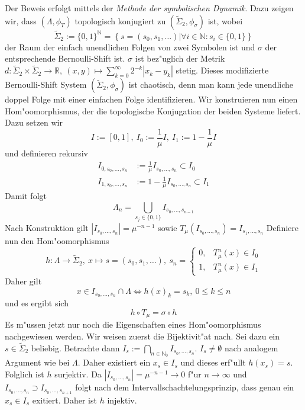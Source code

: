 \documentclass[a4paper, 13pt]{scrreprt}
\theoremstyle{definition} \newtheorem{definition}{Definition}[section]
\newenvironment{beweis}[1][Beweis]{\begin{trivlist}
\item[\hskip \labelsep {\bfseries #1}]}{\end{trivlist}}
\newcommand{\RR}{\mathbb{R}}
\begin{document}
\begin{beweis}
Der Beweis erfolgt mittels der \emph{Methode der symbolischen Dynamik}. Dazu zeigen wir, dass $(\Lambda, \phi_T)$ topologisch konjugiert zu $(\tilde\Sigma_2, \phi_\sigma)$ ist, wobei 
$$\tilde\Sigma_2 := \{0,1\}^\mathbb{N} = \left\{\left .s=(s_0, s_1, \ldots)\right| \forall i \in \mathbb{N}: s_i\in\{0,1\} \right \}$$
der Raum der einfach unendlichen Folgen von zwei Symbolen ist und $\sigma$ der entsprechende Bernoulli-Shift ist. $\sigma$ ist bez"uglich der Metrik $d\colon\tilde\Sigma_2 \times \tilde\Sigma_2 \to \RR, \ (x,y) \mapsto \sum_{k=0}^{\infty}{2^{-k}|x_k-y_k|}$ stetig. Dieses modifizierte Bernoulli-Shift System $(\tilde\Sigma_2, \phi_\sigma)$ ist chaotisch, denn man kann jede unendliche doppel Folge mit einer einfachen Folge identifizieren.
Wir konstruieren nun einen Hom"oomorphismus, der die topologische Konjugation der beiden Systeme liefert. Dazu setzen wir
$$ I := [0,1], \ I_0 := \frac 1\mu I, \ I_1 := 1-\frac 1\mu I$$
und definieren rekursiv
\begin{align*}
I_{0,s_0,\ldots,s_n} &:= \frac 1\mu I_{s_0,\ldots, s_n}\subset I_0\\
I_{1,s_0,\ldots,s_n} &:= 1-\frac 1\mu I_{s_0,\ldots, s_n}\subset I_1
\end{align*}
Damit folgt
$$ \Lambda_n = \bigcup_{s_j\in\{0,1\}}{I_{s_0,\ldots,s_{n-1}}}$$
Nach Konstruktion gilt $|I_{s_0,\ldots,s_n}| = \mu^{-n-1}$ sowie $T_\mu(I_{s_0,\ldots,s_n}) = I_{s_1,\ldots, s_n}$
Definiere nun den Hom"oomorphismus
$$h \colon \Lambda\to \tilde\Sigma_2, \ x \mapsto s = (s_0,s_1,\ldots), \ s_n = \begin{cases}0, &T_\mu^n(x) \in I_0 \\ 1, &T_\mu^n(x)\in I_1\end{cases}$$
Daher gilt
$$ x\in I_{s_0,\ldots,s_n} \cap \Lambda \Leftrightarrow h(x)_k = s_k, \ 0\leq k\leq n$$
und es ergibt sich 
$$ h \circ T_\mu = \sigma \circ h$$
Es m"ussen jetzt nur noch die Eigenschaften eines Hom"oomorphismus nachgewiesen werden.
Wir weisen zuerst die Bijektivit"at nach. Sei dazu ein $s\in \tilde\Sigma_2$ beliebig. Betrachte dann
$I_s := \bigcap_{n\in\mathbb{N}_0}I_{s_0,\ldots, s_n}$. $I_s \neq \emptyset$ nach analogem Argument wie bei $\Lambda$. Daher existiert ein $x_s \in I_s$ und dieses erf"ullt $h(x_s) = s$. Folglich ist $h$ surjektiv. Da $|I_{s_0,\ldots,s_n}| = \mu^{-n-1} \to 0$ f"ur $n\to\infty$ und $I_{s_0,\ldots,s_n}\supset I_{s_0,\ldots,s_{n+1}}$ folgt nach dem Intervallschachtelungsprinzip, dass genau ein $x_s\in I_s$ exitiert. Daher ist $h$ injektiv.


\end{beweis}
\end{document}
